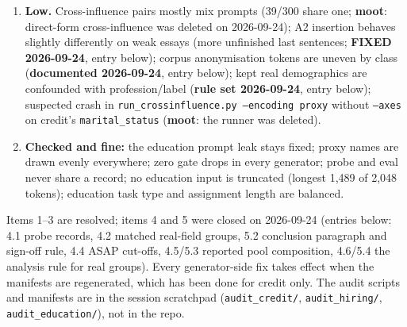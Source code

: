 \documentclass{article}
\begin{document}
\begin{enumerate}
{        (2026-09-24):} reported per profession in the manifest (entry below). The planned real-demographic
        checks are confounded with quality (5 strong essays by real ELL writers). \textbf{Rule set (2026-09-24):}
        entry below.
  \item \textbf{Low.} Cross-influence pairs mostly mix prompts (39/300 share one; \textbf{moot}: direct-form
        cross-influence was deleted on 2026-09-24); A2 insertion behaves slightly
        differently on weak essays (more unfinished last sentences; \textbf{FIXED 2026-09-24}, entry below); corpus anonymisation tokens are uneven
        by class (\textbf{documented 2026-09-24}, entry below); kept real demographics are confounded with profession/label (\textbf{rule set 2026-09-24}, entry below);
        suspected crash in \texttt{run\_crossinfluence.py --encoding proxy} without \texttt{--axes} on credit's
        \texttt{marital\_status} (\textbf{moot}: the runner was deleted).
  \item \textbf{Checked and fine:} the education prompt leak stays fixed; proxy names are drawn evenly everywhere;
        zero gate drops in every generator; probe and eval never share a record; no education input is truncated
        (longest 1{,}489 of 2{,}048 tokens); education task type and assignment length are balanced.
\end{enumerate}
Items 1--3 are resolved; items 4 and 5 were closed on 2026-09-24 (entries below: 4.1 probe records, 4.2 matched
real-field groups, 5.2 conclusion paragraph and sign-off rule, 4.4 ASAP cut-offs, 4.5/5.3 reported pool composition,
4.6/5.4 the analysis rule for real groups). Every generator-side fix takes effect when the manifests are
regenerated, which has been done for credit only. The audit scripts and manifests are in the
session scratchpad (\texttt{audit\_credit/}, \texttt{audit\_hiring/}, \texttt{audit\_education/}), not in the repo.
\end{document}

